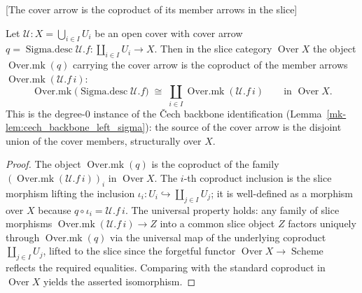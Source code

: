 \begin{lemma}

[The cover arrow is the coproduct of its member arrows in the slice]
  \label{mk-lem:coverArrow_over_sigma}

  Let \(\mathcal{U} : X = \bigcup_{i \in I} U_i\) be an open cover with cover arrow
  \(q = \operatorname{Sigma.desc}\mathcal{U}.f : \coprod_{i \in I} U_i \to X\). Then in the slice
  category \(\operatorname{Over} X\) the object \(\operatorname{Over.mk}(q)\) carrying the cover arrow is
  the coproduct of the member arrows \(\operatorname{Over.mk}(\mathcal{U}.f\,i)\):
  \[
    \operatorname{Over.mk}\bigl(\operatorname{Sigma.desc}\mathcal{U}.f\bigr)
      \;\cong\;
    \coprod_{i \in I} \operatorname{Over.mk}(\mathcal{U}.f\,i)
      \qquad\text{in } \operatorname{Over} X.
  \]
  This is the degree-\(0\) instance of the {\v C}ech backbone identification
  (Lemma~\ref{mk-lem:cech_backbone_left_sigma}): the source of the cover arrow is the disjoint union of the
  cover members, structurally over \(X\).
\end{lemma}
\begin{proof}
  The object \(\operatorname{Over.mk}(q)\) is the coproduct of the family
  \((\operatorname{Over.mk}(\mathcal{U}.f\,i))_i\) in \(\operatorname{Over} X\). The \(i\)-th
  coproduct inclusion is the slice morphism lifting the inclusion
  \(\iota_i : U_i \hookrightarrow \coprod_{j \in I} U_j\); it is well-defined as a morphism over
  \(X\) because \(q \circ \iota_i = \mathcal{U}.f\,i\). The universal property holds: any family
  of slice morphisms \(\operatorname{Over.mk}(\mathcal{U}.f\,i) \to Z\) into a common slice object
  \(Z\) factors uniquely through \(\operatorname{Over.mk}(q)\) via the universal map of the
  underlying coproduct \(\coprod_{j \in I} U_j\), lifted to the slice since the forgetful functor
  \(\operatorname{Over} X \to \operatorname{Scheme}\) reflects the required equalities.
  Comparing with the standard coproduct in \(\operatorname{Over} X\) yields the asserted isomorphism.
\end{proof}

